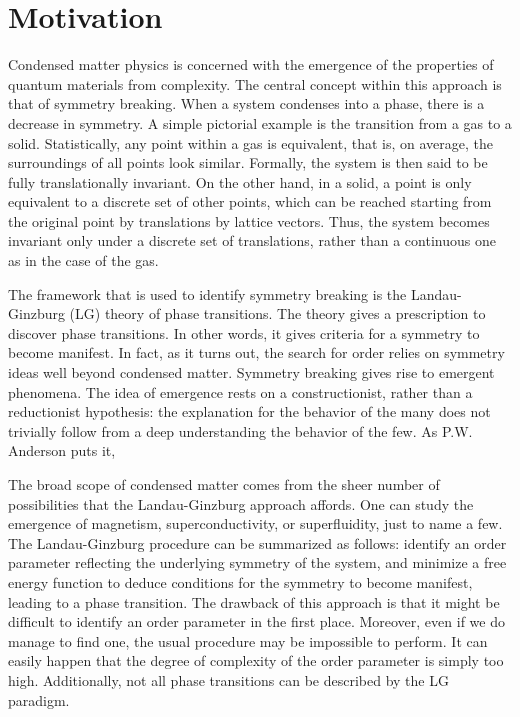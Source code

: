\section{Motivation}
\label{sec:int_motivation}

Condensed matter physics is concerned with the emergence of the properties of quantum materials from complexity.
The central concept within this approach is that of symmetry breaking.
When a system condenses into a phase, there is a decrease in symmetry.
A simple pictorial example is the transition from a gas to a solid.
Statistically, any point within a gas is equivalent, that is, on average, the surroundings of all points look similar.
Formally, the system is then said to be fully translationally invariant.
On the other hand, in a solid, a point is only equivalent to a discrete set of other points, which can be reached starting from the original point by translations by lattice vectors.
Thus, the system becomes invariant only under a discrete set of translations, rather than a continuous one as in the case of the gas. 

The framework that is used to identify symmetry breaking is the Landau-Ginzburg (LG) theory of phase transitions.
The theory gives a prescription to discover phase transitions.
In other words, it gives criteria for a symmetry to become manifest.
In fact, as it turns out, the search for order relies on symmetry ideas well beyond condensed matter.
Symmetry breaking gives rise to emergent phenomena.
The idea of emergence rests on a constructionist, rather than a reductionist hypothesis: the explanation for the behavior of the many does not trivially follow from a deep understanding the behavior of the few.
As P.W. Anderson puts it, 

The broad scope of condensed matter comes from the sheer number of possibilities that the Landau-Ginzburg approach affords.
One can study the emergence of magnetism, superconductivity, or superfluidity, just to name a few.
The Landau-Ginzburg procedure can be summarized as follows: identify an order parameter reflecting the underlying symmetry of the system, and minimize a free energy function to deduce conditions for the symmetry to become manifest, leading to a phase transition.
The drawback of this approach is that it might be difficult to identify an order parameter in the first place.
Moreover, even if we do manage to find one, the usual procedure may be impossible to perform.
It can easily happen that the degree of complexity of the order parameter is simply too high.
Additionally, not all phase transitions can be described by the LG paradigm.

